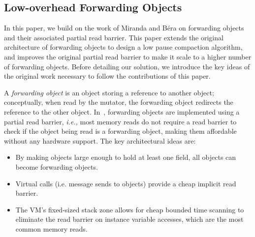 \documentclass[sigplan,10pt,review,anonymous]{acmart}\settopmatter{printfolios=true,printccs=false,printacmref=false}
\def\ie{\emph{i.e., }}
\begin{document}


\subsection{Low-overhead Forwarding Objects}

In this paper, we build on the work of Miranda and B\'era \cite{Forwarders} on forwarding objects and their associated partial read barrier.
This paper extends the original architecture of forwarding objects to design a low pause compaction algorithm, and improves the original partial read barrier to make it scale to a higher number of forwarding objects.
Before detailing our solution, we introduce the key ideas of the original work necessary to follow the contributions of this paper. 

A \emph{forwarding object} is an object storing a reference to another object; conceptually, when read by the mutator, the forwarding object redirects the reference to the other object.
In~\cite{Forwarders}, forwarding objects are implemented using a partial read barrier, \ie most memory reads do not require a read barrier to check if the object being read is a forwarding object, making them affordable without any hardware support. 
The key architectural ideas are:
\begin{itemize}
	\item By making objects large enough to hold at least one field, all objects can become forwarding objects. 
	\item Virtual calls (i.e. message sends to objects) provide a cheap implicit read barrier.
	\item The VM's fixed-sized stack zone allows for cheap bounded time scanning to eliminate the read barrier on instance variable accesses, which are the most common memory reads.
\end{itemize}
\end{document}
